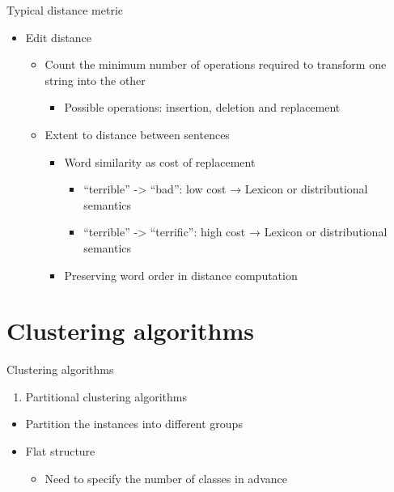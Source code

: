 \documentclass[
  ignorenonframetext,
]{beamer}
\providecommand{\tightlist}{%
  \setlength{\itemsep}{0pt}\setlength{\parskip}{0pt}}
\begin{document}
\begin{frame}{Typical distance metric}
\protect\hypertarget{typical-distance-metric-2}{}
\begin{itemize}
\item
  Edit distance

  \begin{itemize}
  \item
    Count the minimum number of operations required to transform one
    string into the other

    \begin{itemize}
    \tightlist
    \item
      Possible operations: insertion, deletion and replacement
    \end{itemize}
  \item
    Extent to distance between sentences

    \begin{itemize}
    \item
      Word similarity as cost of replacement

      \begin{itemize}
      \item
        ``terrible'' -\textgreater{} ``bad'': low cost {→ Lexicon or
        distributional semantics}
      \item
        ``terrible'' -\textgreater{} ``terrific'': high cost {→ Lexicon
        or distributional semantics}
      \end{itemize}
    \item
      Preserving word order in distance computation
    \end{itemize}
  \end{itemize}
\end{itemize}
\end{frame}

\hypertarget{clustering-algorithms}{%
\section{Clustering algorithms}\label{clustering-algorithms}}

\begin{frame}{Clustering algorithms}
\protect\hypertarget{clustering-algorithms-1}{}
\begin{enumerate}
\tightlist
\item
  Partitional clustering algorithms
\end{enumerate}

\begin{itemize}
\item
  Partition the instances into different groups
\item
  Flat structure

  \begin{itemize}
  \tightlist
  \item
    Need to specify the number of classes in advance
  \end{itemize}
\end{itemize}
\end{frame}
\end{document}
